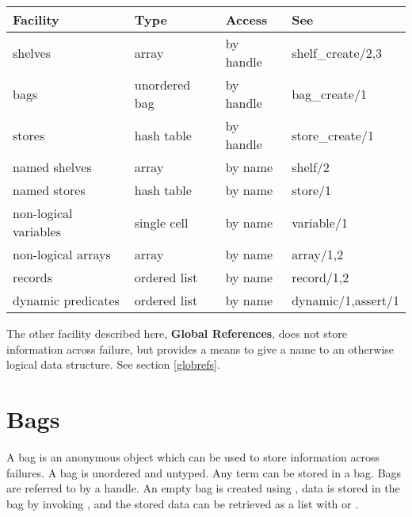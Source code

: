 \vspace{2mm}
\begin{center}
\begin{tabular}{l|l l l}
Facility & Type & Access & See \\ 
\hline        
shelves&                array&          by handle&      shelf_create/2,3 \\
bags&                   unordered bag&  by handle&      bag_create/1 \\
stores&                 hash table&     by handle&      store_create/1 \\
named shelves&          array&          by name&        shelf/2 \\
named stores&           hash table&     by name&        store/1 \\
non-logical variables&  single cell&    by name&        variable/1 \\
non-logical arrays&     array&          by name&        array/1,2 \\
records&                ordered list&   by name&        record/1,2 \\
dynamic predicates&     ordered list&   by name&        dynamic/1,assert/1 \\
\end{tabular}
\end{center}
\vspace{2mm}

The other facility described here, {\bf Global References}, does not store
information across failure, but provides a means to give a name to
an otherwise logical data structure. See section \ref{globrefs}.


\section{Bags}

A bag is an anonymous object which can be used to store
information across failures.
A bag is unordered and untyped. Any {\eclipse} term can be stored in a bag.
Bags are referred to by a handle.
An empty bag is created using
,
data is stored in the bag by invoking
,
and the stored data can be retrieved as a list with
 or
.


